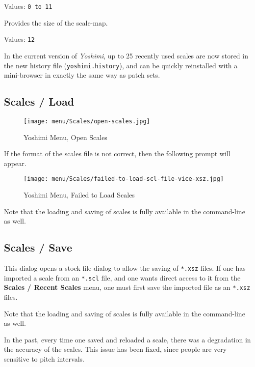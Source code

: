    Values: \texttt{0 to 11}

   Provides the size of the scale-map.

   Values: \texttt{12}

   In the current version of \textsl{Yoshimi}, up to 25 recently used scales are
   now stored in the new history file
   (\texttt{yoshimi.history}), and can be quickly reinstalled with a
   mini-browser in exactly the same way as patch sets.

\subsection{Scales / Load}
\label{subsec:scales_load}

\begin{figure}[H]
   \centering
   \texttt{[image: menu/Scales/open-scales.jpg]}
   \caption{Yoshimi Menu, Open Scales}
   \label{fig:yoshimi_open_scales}
\end{figure}

   If the format of the scales file is not correct, then the following prompt
   will appear.

\begin{figure}[H]
   \centering
   \texttt{[image: menu/Scales/failed-to-load-scl-file-vice-xsz.jpg]}
   \caption{Yoshimi Menu, Failed to Load Scales}
   \label{fig:yoshimi_failed_to_load_scales}
\end{figure}

   Note that the loading and saving of scales is fully available in the
   command-line as well.

\subsection{Scales / Save}
\label{subsec:scales_save}

   This dialog opens a stock file-dialog to allow the saving of
   \texttt{*.xsz} files.
   If one has imported a scale from an \texttt{*.scl} file, and one
   wants direct access to it from the \textbf{Scales / Recent Scales} menu, one
   must first save the imported file as an \texttt{*.xsz} files.

   Note that the loading and saving of scales is fully available in the
   command-line as well.

   In the past, every time one saved and reloaded a scale, there was a
   degradation in the accuracy of the scales.  This issue has been fixed, since
   people are very sensitive to pitch intervals.

